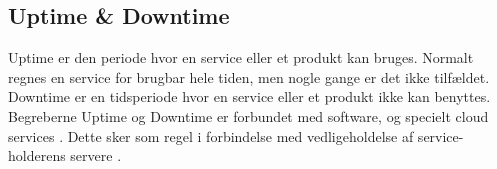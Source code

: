 \subsection{Uptime \& Downtime}
Uptime er den periode hvor en service eller et produkt kan bruges. Normalt regnes en service for brugbar hele tiden, men nogle gange er det ikke tilfældet. Downtime er en tidsperiode hvor en service eller et produkt ikke kan benyttes. Begreberne Uptime og Downtime er  forbundet med software, og specielt cloud services \citep{drpbx_downtime, UpDown}. Dette sker som regel i forbindelse med vedligeholdelse af service-holderens servere \citep{drpbx_downtime}.